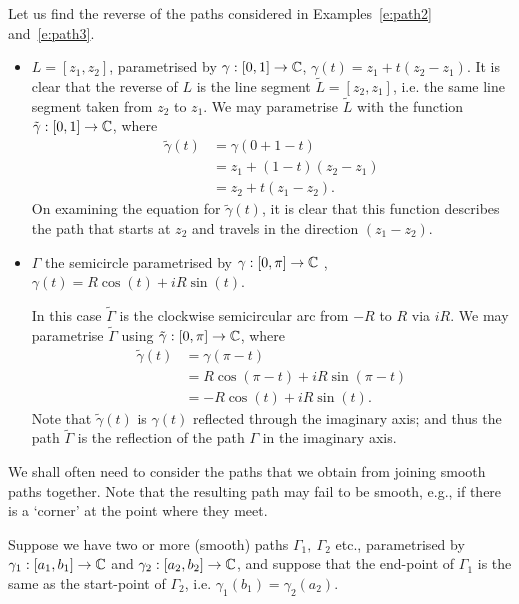 \begin{example}
Let us find the reverse of the paths considered in Examples~\ref{e:path2} and~\ref{e:path3}.
\end{example}
\begin{solution}
\begin{itemize}
\item $L=[z_1, z_2 ] $, parametrised by $\gamma:[0,1] \to \mathbb{C}$, $\gamma (t) = z_1 + t ( z_2 - z_1 )$.
It is clear that the reverse of $L$ is the line segment $\tilde{L}=[z_2,z_1]$, i.e. the same line segment taken from $z_2$ to $z_1$.  We may parametrise $\tilde{L}$ with the function $\tilde{\gamma}:[0,1] \to \mathbb{C}$, where
\begin{align*}
\tilde{\gamma} (t) & = \gamma (0+1-t ) \\
& = z_1 + (1-t)(z_2-z_1) \\
& = z_2+t(z_1-z_2).
\end{align*}
On examining the equation for $\tilde{\gamma} (t)$, it is clear that this function describes the path that starts at $z_2$ and travels in the direction $(z_1-z_2)$.
\item  $\Gamma$ the semicircle parametrised by $\gamma:[0,\pi] \to \mathbb{C}$ , $\gamma (t) = R \cos (t) + i R \sin (t)$. 

In this case $\tilde{\Gamma}$ is the clockwise semicircular arc from $-R$ to $R$ via $iR$.  We may parametrise $\tilde{\Gamma}$ using $\tilde{\gamma}:[0,\pi] \to \mathbb{C}$, where
\begin{align*}
\tilde{\gamma} (t) & = \gamma ( \pi-t) \\
& = R \cos ( \pi-t)+iR \sin (\pi-t) \\
& = -R \cos (t) + i R \sin (t).
\end{align*}
Note that $\tilde{\gamma} (t)$ is $\gamma (t)$ reflected through the imaginary axis; and thus the path $\tilde{\Gamma}$ is the reflection of the path $\Gamma$ in the imaginary axis.

\end{itemize}
\end{solution}

We shall often need to consider the paths that we obtain from joining smooth paths together.  Note that the resulting path may fail to be smooth, e.g., if there is a `corner' at the point where they meet.

Suppose we have two or more (smooth) paths $\Gamma_1,\ \Gamma_2$ etc., parametrised by $\gamma_1:[a_1,b_1] \to \mathbb{C}$ and $\gamma_2:[a_2,b_2] \to \mathbb{C}$, and suppose that the end-point of $\Gamma_1$ is the same as the start-point of $\Gamma_2$, i.e. $\gamma_1(b_1)=\gamma_2(a_2)$.

